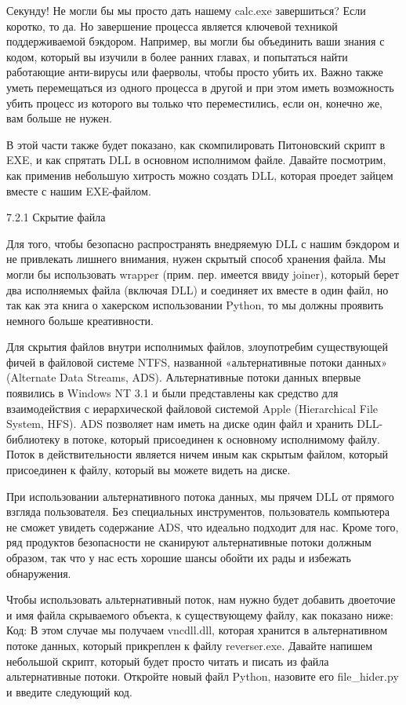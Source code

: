 \documentclass[12pt]{book}
\begin{document}
Секунду! Не могли бы мы просто дать нашему calc.exe завершиться? Если коротко, то да. Но завершение процесса является ключевой техникой поддерживаемой бэкдором. Например, вы могли бы объединить ваши знания с кодом, который вы изучили в более ранних главах, и попытаться найти работающие анти-вирусы или фаерволы, чтобы просто убить их. Важно также уметь перемещаться из одного процесса в другой и при этом иметь возможность убить процесс из которого вы только что переместились, если он, конечно же, вам больше не нужен. 

В этой части также будет показано, как скомпилировать Питоновский скрипт в EXE, и как спрятать DLL в основном исполнимом файле. Давайте посмотрим, как применив небольшую хитрость можно создать DLL, которая проедет зайцем вместе с нашим EXE-файлом.

7.2.1 Скрытие файла

Для того, чтобы безопасно распространять внедряемую DLL с нашим бэкдором и не привлекать лишнего внимания, нужен скрытый способ хранения файла. Мы могли бы использовать wrapper (прим. пер. имеется ввиду joiner), который берет два исполняемых файла (включая DLL) и соединяет их вместе в один файл, но так как эта книга о хакерском использовании Python, то мы должны проявить немного больше креативности.

Для скрытия файлов внутри исполнимых файлов, злоупотребим существующей фичей в файловой системе NTFS, названной «альтернативные потоки данных» (Alternate Data Streams, ADS). Альтернативные потоки данных впервые появились в Windows NT 3.1 и были представлены как средство для взаимодействия с иерархической файловой системой Apple (Hierarchical File System, HFS). ADS позволяет нам иметь на диске один файл и хранить DLL-библиотеку в потоке, который присоединен к основному исполнимому файлу. Поток в действительности является ничем иным как скрытым файлом, который присоединен к файлу, который вы можете видеть на диске.

При использовании альтернативного потока данных, мы прячем DLL от прямого взгляда пользователя. Без специальных инструментов, пользователь компьютера не сможет увидеть содержание ADS, что идеально подходит для нас. Кроме того, ряд продуктов безопасности не сканируют альтернативные потоки должным образом, так что у нас есть хорошие шансы обойти их рады и избежать обнаружения. 

Чтобы использовать альтернативный поток, нам нужно будет добавить двоеточие и имя файла скрываемого объекта, к существующему файлу, как показано ниже:
Код:
В этом случае мы получаем vncdll.dll, которая хранится в альтернативном потоке данных, который прикреплен к файлу reverser.exe. Давайте напишем небольшой скрипт, который будет просто читать и писать из файла альтернативные потоки. Откройте новый файл Python, назовите его file\_hider.py и введите следующий код.
\end{document}
